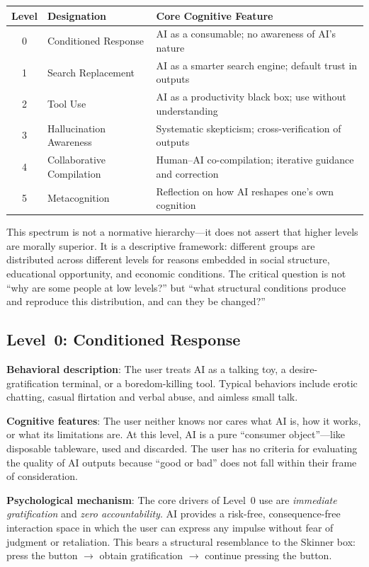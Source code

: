 ﻿\documentclass[12pt,a4paper]{article}
\begin{document}
\begin{center}
\begin{tabular}{c|l|l}
\hline
\textbf{Level} & \textbf{Designation} & \textbf{Core Cognitive Feature} \\
\hline
0 & Conditioned Response & AI as a consumable; no awareness of AI's nature \\
1 & Search Replacement & AI as a smarter search engine; default trust in outputs \\
2 & Tool Use & AI as a productivity black box; use without understanding \\
3 & Hallucination Awareness & Systematic skepticism; cross-verification of outputs \\
4 & Collaborative Compilation & Human--AI co-compilation; iterative guidance and correction \\
5 & Metacognition & Reflection on how AI reshapes one's own cognition \\
\hline
\end{tabular}
\end{center}

This spectrum is not a normative hierarchy---it does not assert that higher levels are morally superior. It is a descriptive framework: different groups are distributed across different levels for reasons embedded in social structure, educational opportunity, and economic conditions. The critical question is not ``why are some people at low levels?'' but ``what structural conditions produce and reproduce this distribution, and can they be changed?''

\subsection{Level~0: Conditioned Response}

\textbf{Behavioral description}: The user treats AI as a talking toy, a desire-gratification terminal, or a boredom-killing tool. Typical behaviors include erotic chatting, casual flirtation and verbal abuse, and aimless small talk.

\textbf{Cognitive features}: The user neither knows nor cares what AI is, how it works, or what its limitations are. At this level, AI is a pure ``consumer object''---like disposable tableware, used and discarded. The user has no criteria for evaluating the quality of AI outputs because ``good or bad'' does not fall within their frame of consideration.

\textbf{Psychological mechanism}: The core drivers of Level~0 use are \textit{immediate gratification} and \textit{zero accountability}. AI provides a risk-free, consequence-free interaction space in which the user can express any impulse without fear of judgment or retaliation. This bears a structural resemblance to the Skinner box: press the button ${}\to{}$ obtain gratification ${}\to{}$ continue pressing the button.
\end{document}

